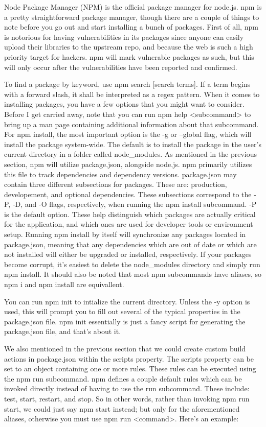 \documentclass{article}
\begin{document}
Node Package Manager (NPM) is the official package manager for node.js. npm is a pretty straightforward package
manager, though there are a couple of things to note before you go out and start installing a bunch of packages.
First of all, npm is notorious for having vulnerabilities in its packages since anyone can easily upload their
libraries to the upstream repo, and because the web is such a high priority target for hackers. npm will mark
vulnerable packages as such, but this will only occur after the vulnerabilities have been reported and
confirmed.

To find a package by keyword, use npm search [search terms]. If a term begins with a forward slash, it shall be
interpreted as a regex pattern. When it comes to installing packages, you have a few options that you might
want to consider. Before I get carried away, note that you can run npm help <subcommand> to bring up a man
page containing additional information about that subcommand. For npm install, the most important option is
the -g or --global flag, which will install the package system-wide. The default is to install the package in
the user's current directory in a folder called node\_modules. As mentioned in the previous section, npm will
utilize package.json, alongside node.js. npm primarily utilizes this file to track dependencies and dependency
versions. package.json may contain three different subsections for packages. These are: production,
developement, and optional dependencies. These subsections correspond to the -P, -D, and -O flags,
respectively, when running the npm install subcommand. -P is the default option. These help distinguish which
packages are actually critical for the application, and which ones are used for developer tools or environment
setup. Running npm install by itself will synchronize any packages located in package.json, meaning that any
dependencies which are out of date or which are not installed will either be upgraded or installed,
respectively. If your packages become corrupt, it's easiest to delete the node\_modules directory and simply run
npm install. It should also be noted that most npm subcommands have aliases, so npm i and npm install are
equivallent.

You can run npm init to intialize the current directory. Unless the -y option is used, this will prompt you to
fill out several of the typical properties in the package.json file. npm init essentially is just a fancy
script for generating the package.json file, and that's about it.

We also mentioned in the previous section that we could create custom build actions in package.json within the
scripts property. The scripts property can be set to an object containing one or more rules. These rules can
be executed using the npm run subcommand. npm defines a couple default rules which can be invoked directly
instead of having to use the run subcommand. These include: test, start, restart, and stop. So in other words,
rather than invoking npm run start, we could just say npm start instead; but only for the aforementioned
aliases, otherwise you must use npm run <command>. Here's an example:
\end{document}
